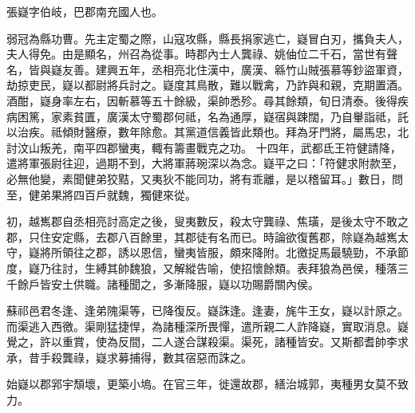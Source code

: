 \begin{pinyinscope}
 
 
 張嶷字伯岐，巴郡南充國人也。
 
 
 弱冠為縣功曹。先主定蜀之際，山寇攻縣，縣長捐家逃亡，嶷冒白刃，攜負夫人，夫人得免。由是顯名，州召為從事。時郡內士人龔祿、姚伷位二千石，當世有聲名，皆與嶷友善。建興五年，丞相亮北住漢中，廣漢、緜竹山賊張慕等鈔盜軍資，劫掠吏民，嶷以都尉將兵討之。嶷度其鳥散，難以戰禽，乃詐與和親，克期置酒。酒酣，嶷身率左右，因斬慕等五十餘級，渠帥悉殄。尋其餘類，旬日清泰。後得疾病困篤，家素貧匱，廣漢太守蜀郡何祗，名為通厚，嶷宿與踈闊，乃自轝詣祗，託以治疾。祗傾財醫療，數年除愈。其黨道信義皆此類也。拜為牙門將，屬馬忠，北討汶山叛羌，南平四郡蠻夷，輙有籌畫戰克之功。
 十四年，武都氐王符健請降，遣將軍張尉往迎，過期不到，大將軍蔣琬深以為念。嶷平之曰：「符健求附款至，必無他變，素聞健弟狡黠，又夷狄不能同功，將有乖離，是以稽留耳。」數日，問至，健弟果將四百戶就魏，獨健來從。
 
 
 
 
 初，越嶲郡自丞相亮討高定之後，叟夷數反，殺太守龔祿、焦璜，是後太守不敢之郡，只住安定縣，去郡八百餘里，其郡徒有名而已。時論欲復舊郡，除嶷為越嶲太守，嶷將所領往之郡，誘以恩信，蠻夷皆服，頗來降附。北徼捉馬最驍勁，不承節度，嶷乃往討，生縛其帥魏狼，又解縱告喻，使招懷餘類。表拜狼為邑侯，種落三千餘戶皆安土供職。諸種聞之，多漸降服，嶷以功賜爵關內侯。
 
 
 
 
 蘇祁邑君冬逢、逢弟隗渠等，已降復反。嶷誅逢。逢妻，旄牛王女，嶷以計原之。而渠逃入西徼。渠剛猛捷悍，為諸種深所畏憚，遣所親二人詐降嶷，實取消息。嶷覺之，許以重賞，使為反間，二人遂合謀殺渠。渠死，諸種皆安。又斯都耆帥李求承，昔手殺龔祿，嶷求募捕得，數其宿惡而誅之。
 
 
 
 
 始嶷以郡郛宇頹壞，更築小塢。在官三年，徙還故郡，繕治城郭，夷種男女莫不致力。
 
 
 

\end{pinyinscope}
